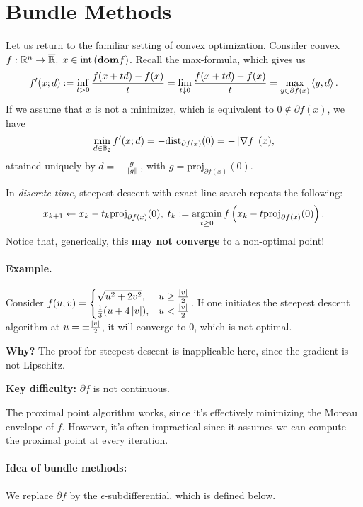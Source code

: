 \section{Bundle Methods}
Let us return to the familiar setting of convex optimization. Consider convex
$f: \mathbb{R}^n \to \overline{\mathbb{R}}, \; x \in \mathrm{int}\left( \textbf{dom} f \right)$. Recall the
max-formula, which gives us
\[
	f'(x; d) := \inf_{t > 0} \frac{f(x + td) - f(x)}{t} = \lim_{t \downarrow 0}
	\frac{f(x + td) - f(x)}{t} = \max_{y \in \partial f(x)} \left\langle y, d \right\rangle.
\]
If we assume that $x$ is not a minimizer, which is equivalent to $0 \notin
\partial f(x)$, we have
\[
	\min_{d \in \mathbb{B}_2} f'(x; d) = -\mathrm{dist}_{\partial f(x)}(0)
	= - \left| \nabla f \right|(x),
\]
attained uniquely by $d = - \frac{g}{\left \| g \right \|}$, with $g =
\mathrm{proj}_{\partial f(x)}(0)$.

In \textit{discrete time}, steepest descent with exact line search repeats the
following:
\[
	x_{k+1} \gets x_k - t_k \mathrm{proj}_{\partial f(x)}(0), \;
	t_k := \operatorname*{argmin}_{t \geq 0} f\left(x_k - t \mathrm{proj}_{\partial
	f(x)}(0)\right).
\]
Notice that, generically, this \textbf{may not converge} to a non-optimal
point!

\paragraph{Example.} Consider $f(u, v) = \begin{cases}
	\sqrt{u^2 + 2v^2}, & u \geq \frac{\left| v \right|}{2} \\
\frac{1}{3} (u + 4 \left| v \right|), & u < \frac{\left| v \right|}{2} \end{cases}$. If one
initiates the steepest descent algorithm at $u = \pm \frac{\left| v \right|}{2}$, it
will converge to $0$, which is not optimal.

\textbf{Why?} The proof for steepest descent is inapplicable here, since the
gradient is not Lipschitz.

\textbf{Key difficulty:} $\partial f$ is not continuous.

The proximal point algorithm works, since it's effectively minimizing
the Moreau envelope of $f$. However, it's often impractical since it assumes we
can compute the proximal point at every iteration.

\paragraph{Idea of bundle methods:} We replace $\partial f$ by the
$\epsilon$-subdifferential, which is defined below.

